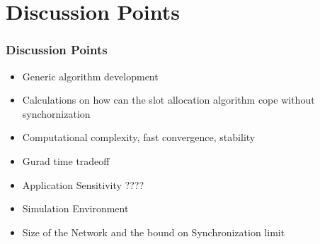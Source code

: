 \documentclass[t]{beamer}
\begin{document}
\section{Discussion Points}

\begin{frame}
    \frametitle{Discussion Points}
    \begin{itemize}
    \item Generic algorithm development \newline
    \item Calculations on how can the slot allocation algorithm cope without synchornization \newline
    \item Computational complexity, fast convergence, stability \newline
    \item Gurad time tradeoff \newline
    \item Application Sensitivity ????  \newline
    \item Simulation Environment \newline
    \item Size of the Network and the bound on Synchronization limit
    \end{itemize}
\end{frame}
\end{document}
